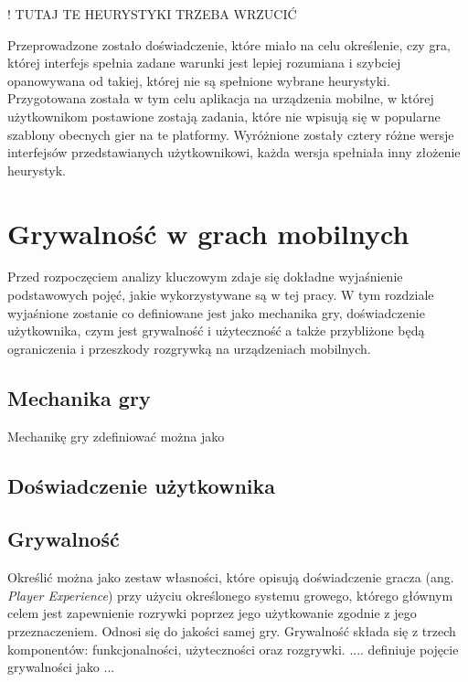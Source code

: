 \documentclass[a4paper,12pt,numbers=noenddot]{report}
\begin{document}
! TUTAJ TE HEURYSTYKI TRZEBA WRZUCIĆ

Przeprowadzone zostało doświadczenie, które miało na celu określenie, czy gra, której interfejs spełnia zadane warunki jest lepiej rozumiana i szybciej opanowywana od takiej, której nie są spełnione wybrane heurystyki. Przygotowana została w tym celu aplikacja na urządzenia mobilne, w której użytkownikom postawione zostają zadania, które nie wpisują się w popularne szablony obecnych gier na te platformy. Wyróżnione zostały cztery różne wersje interfejsów przedstawianych użytkownikowi, każda wersja spełniała inny złożenie heurystyk.

\chapter{Grywalność w grach mobilnych}
Przed rozpoczęciem analizy kluczowym zdaje się dokładne wyjaśnienie podstawowych pojęć, jakie wykorzystywane są w tej pracy. W tym rozdziale wyjaśnione zostanie co definiowane jest jako mechanika gry, doświadczenie użytkownika, czym jest grywalność i użyteczność a także przybliżone będą ograniczenia i przeszkody rozgrywką na urządzeniach mobilnych.
\section{Mechanika gry}
Mechanikę gry zdefiniować można jako  \cite{online_GameMechanics}

\section{Doświadczenie użytkownika}

\cite{art_UserExperience}

\section{Grywalność}
Określić można jako zestaw własności, które opisują doświadczenie gracza (ang. \textit{Player Experience}) przy użyciu określonego systemu growego, którego głównym celem jest zapewnienie rozrywki poprzez jego użytkowanie zgodnie z jego przeznaczeniem. Odnosi się do jakości samej gry.
Grywalność składa się z trzech komponentów: funkcjonalności, użyteczności oraz rozgrywki.
 .... definiuje pojęcie grywalności jako ... \cite{art_Playability}
\end{document}
